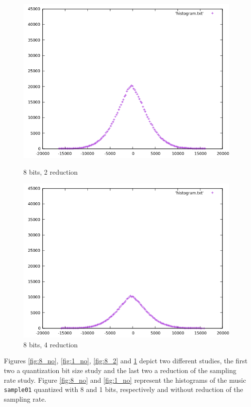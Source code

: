 \documentclass[12pt]{article}
\begin{document}
\begin{figure}[H]
  \begin{minipage}{.5\textwidth}
    \centering
    \includegraphics[width=\linewidth]{sample01_8_2.png}
    \caption{{8 bits, 2 reduction}}
    \label{fig:8_2}
  \end{minipage}
  \begin{minipage}{.5\textwidth}
    \centering
    \includegraphics[width=\linewidth]{sample01_8_4.png}
    \caption{{8 bits, 4 reduction}}
    \label{fig:8_4}
  \end{minipage}
\end{figure}

Figures \ref{fig:8_no}, \ref{fig:1_no}, \ref{fig:8_2} and \ref{fig:8_4} depict two different studies, the first two a quantization bit size study and the last two a reduction of the sampling rate study. Figure \ref{fig:8_no} and \ref{fig:1_no} represent the histograms of the music \texttt{sample01} quantized with 8 and 1 bits, respectively and without reduction of the sampling rate. 
\end{document}
